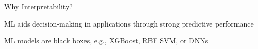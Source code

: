 \documentclass[10pt,compress,t,notes=noshow, xcolor=table]{beamer}
\begin{document}





\begin{framev}[align=top]{Why Interpretability?}
\begin{itemizeM}
\item ML aids decision-making in applications through strong predictive performance
\item ML models are black boxes, e.g., XGBoost, RBF SVM, or DNNs\\

\end{itemizeM}
\end{framev}
\end{document}
